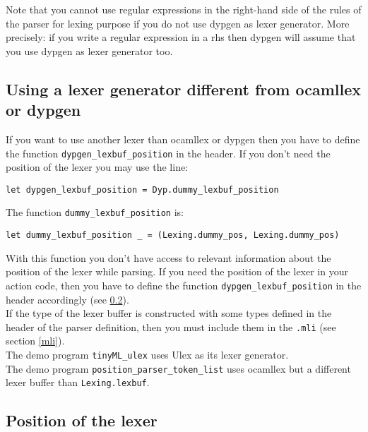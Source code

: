 \documentclass[12pt]{article}
\begin{document}
{Note that you cannot use regular expressions in the right-hand side of the
rules of the parser for lexing purpose if you do not use dypgen as lexer generator. More precisely: if you write a regular expression in a rhs then dypgen will assume that you use dypgen as lexer generator too.

\subsection{Using a lexer generator different from ocamllex or dypgen}

If you want to use another lexer than ocamllex or dypgen then you have to define the function \verb|dypgen_lexbuf_position| in the header. If you don't need the position of the lexer you may use the line:
\begin{verbatim}
let dypgen_lexbuf_position = Dyp.dummy_lexbuf_position
\end{verbatim}
The function \verb|dummy_lexbuf_position| is:
\begin{verbatim}
let dummy_lexbuf_position _ = (Lexing.dummy_pos, Lexing.dummy_pos)
\end{verbatim}

With this function you don't have access to relevant information about the position of the lexer while parsing. If you need the position of the lexer in your action code, then you have to define the function \verb|dypgen_lexbuf_position| in the header accordingly (see \ref{position}).\\

If the type of the lexer buffer is constructed with some types defined in the header of the parser definition, then you must include them in the \verb|.mli| (see section \ref{mli}).\\

The demo program \verb|tinyML_ulex| uses Ulex as its lexer generator.\\
The demo program \verb|position_parser_token_list| uses ocamllex but a different lexer buffer than \verb|Lexing.lexbuf|.

\subsection{Position of the lexer}\label{position}

}
\end{document}
